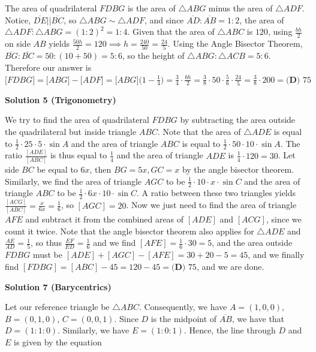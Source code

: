 \begin{enumerate}
The area of quadrilateral $FDBG$ is the area of $\bigtriangleup ABG$ minus the area of $\bigtriangleup ADF$. Notice, $\overline{DE} || \overline{BC}$, so $\bigtriangleup ABG \sim \bigtriangleup ADF$, and since $\overline{AD}:\overline{AB}=1:2$, the area of $\bigtriangleup ADF:\bigtriangleup ABG=(1:2)^2=1:4$. Given that the area of $\bigtriangleup ABC$ is $120$, using $\frac{bh}{2}$ on side $AB$ yields $\frac{50h}{2}=120\implies h=\frac{240}{50}=\frac{24}{5}$. Using the Angle Bisector Theorem, $\overline{BG}:\overline{BC}=50:(10+50)=5:6$, so the height of $\bigtriangleup ABG: \bigtriangleup ACB=5:6$. Therefore our answer is $\big[ FDBG\big] = \big[ABG\big]-\big[ ADF\big] = \big[ ABG\big]\big(1-\frac{1}{4}\big)=\frac{3}{4}\cdot \frac{bh}{2}=\frac{3}{8}\cdot 50\cdot \frac{5}{6}\cdot \frac{24}{5}=\frac{3}{8}\cdot 200=\boxed{\textbf{(D) }75}$




\textbf{Solution 5 (Trigonometry)}

We try to find the area of quadrilateral $FDBG$ by subtracting the area outside the quadrilateral but inside triangle $ABC$. Note that the area of $\triangle ADE$ is equal  to $\frac{1}{2} \cdot 25 \cdot 5 \cdot \sin{A}$ and the area of triangle $ABC$ is equal to $\frac{1}{2} \cdot 50 \cdot 10 \cdot \sin A$. The ratio $\frac{[ADE]}{[ABC]}$ is thus equal to $\frac{1}{4}$ and the area of triangle $ADE$ is $\frac{1}{4} \cdot 120 = 30$. Let side $BC$ be equal to $6x$, then $BG = 5x, GC = x$ by the angle bisector theorem. Similarly, we find the area of triangle $AGC$ to be $\frac{1}{2} \cdot 10 \cdot x \cdot \sin C$ and the area of triangle $ABC$ to be $\frac{1}{2} \cdot 6x \cdot 10 \cdot \sin C$. A ratio between these two triangles yields $\frac{[ACG]}{[ABC]} = \frac{x}{6x} = \frac{1}{6}$, so $[AGC] = 20$. Now we just need to find the area of triangle $AFE$ and subtract it from the combined areas of $[ADE]$ and $[ACG]$, since we count it twice. Note that the angle bisector theorem also applies for $\triangle ADE$ and $\frac{AE}{AD} = \frac{1}{5}$, so thus $\frac{EF}{ED} = \frac{1}{6}$ and we find $[AFE] = \frac{1}{6} \cdot 30 = 5$, and the area outside $FDBG$ must be $[ADE] + [AGC] - [AFE] = 30 + 20 - 5 = 45$, and we finally find  $[FDBG] = [ABC] - 45 = 120 -45 = \boxed{\textbf{(D) }75}$, and we are done.

 



\textbf{Solution 7 (Barycentrics)}

Let our reference triangle be $\triangle ABC$. Consequently, we have $A=(1,0,0)$, $B=(0,1,0)$, $C=(0,0,1).$ Since $D$ is the midpoint of $\overline{AB}$, we have that $D=(1:1:0)$. Similarly, we have $E=(1:0:1).$ Hence, the line through $D$ and $E$ is given by the equation 


\end{enumerate}
